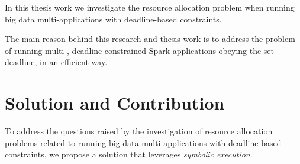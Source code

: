 In this thesis work we investigate the resource allocation problem when running big data multi-\plan applications with deadline-based \qos constraints. 

The main reason behind this research and thesis work is to address the problem of running multi-\plan, deadline-constrained Spark applications obeying the set deadline, in an efficient way.

\section{Solution and Contribution}\label{sec:solution_contribution}
To address the questions raised by the investigation of resource allocation problems related to running big data multi-\plan applications with deadline-based \qos constraints, we propose a solution that leverages \textit{symbolic execution}. 





